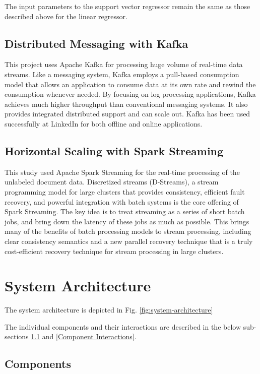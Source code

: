 \documentclass[conference]{IEEEtran}
\begin{document}
        The input parameters to the support vector regressor remain the same as those described above for the linear regressor.


    \subsection{Distributed Messaging with Kafka}
        This project uses Apache Kafka for processing huge volume of real-time data streams. Like a messaging system, Kafka employs a pull-based consumption model that allows an application to consume data at its own rate and rewind the consumption whenever needed. By focusing on log processing applications, Kafka achieves much higher throughput than conventional messaging systems. It also provides integrated distributed support and can scale out. Kafka has been used successfully at LinkedIn for both offline and online applications. \cite{kreps2011kafka}

    \subsection{Horizontal Scaling with Spark Streaming}
        This study used Apache Spark Streaming for the real-time processing of the unlabeled document data. Discretized streams (D-Streams), a stream programming model for large clusters that provides consistency, efficient fault recovery, and powerful integration with batch systems is the core offering of Spark Streaming. The key idea is to treat streaming as a series of short batch jobs, and bring down the latency of these jobs as much as possible. This brings many of the benefits of batch processing models to stream processing, including clear consistency semantics and a new parallel recovery technique that is a truly cost-efficient recovery technique for stream processing in large clusters\cite{zaharia2012discretized}.

\vspace{5mm}

\section{System Architecture}
    The system architecture is depicted in Fig. \ref{fig:system-architecture}

    The individual components and their interactions are described in the below sub-sections \ref{Components} and \ref{Component Interactions}.

    \subsection{Components} \label{Components}
\end{document}
